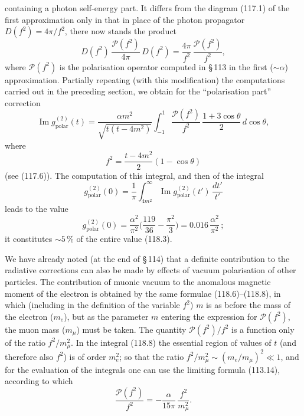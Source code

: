 
\begin{equation}
\label{eq:118.5}
\end{equation}


\noindent containing a photon self-energy part. It differs from the diagram (117.1) of the first approximation only in that in place of the photon propagator $D(f^2) = 4\pi/f^2$, there now stands the product
\[
D(f^2)\,\frac{\mathcal{P}(f^2)}{4\pi}\,D(f^2) = \frac{4\pi}{f^2}\,\frac{\mathcal{P}(f^2)}{f^2},
\]
where $\mathcal{P}(f^2)$ is the polarisation operator computed in \S\,113 in the first ($\sim\alpha$) approximation. Partially repeating (with this modification) the computations carried out in the preceding section, we obtain for the ``polarisation part'' correction
\begin{equation}
\operatorname{Im} g^{(2)}_{\text{polar}}(t) = \frac{\alpha m^2}{\sqrt{t(t-4m^2)}}\int_{-1}^{1}\frac{\mathcal{P}(f^2)}{f^2}\,\frac{1+3\cos\theta}{2}\,d\cos\theta,
\label{eq:118.6}
\end{equation}
where
\begin{equation}
f^2 = \frac{t-4m^2}{2}(1-\cos\theta)
\label{eq:118.7}
\end{equation}
(see (117.6)). The computation of this integral, and then of the integral
\begin{equation}
g^{(2)}_{\text{polar}}(0) = \frac{1}{\pi}\int_{4m^2}^{\infty}\operatorname{Im} g^{(2)}_{\text{polar}}(t')\,\frac{dt'}{t'}
\label{eq:118.8}
\end{equation}
leads to the value
\begin{equation}
g^{(2)}_{\text{polar}}(0) = \frac{\alpha^2}{\pi^2}\biggl(\frac{119}{36} - \frac{\pi^2}{3}\biggr) = 0.016\,\frac{\alpha^2}{\pi^2}\,;
\label{eq:118.9}
\end{equation}
it constitutes $\sim 5\,\%$ of the entire value (118.3).

We have already noted (at the end of \S\,114) that a definite contribution to the radiative corrections can also be made by effects of vacuum polarisation of other particles. The contribution of muonic vacuum to the anomalous magnetic moment of the electron is obtained by the same formulae (118.6)--(118.8), in which (including in the definition of the variable $f^2$) $m$ is as before the mass of the electron ($m_e$), but as the parameter $m$ entering the expression for $\mathcal{P}(f^2)$, the muon mass ($m_\mu$) must be taken. The quantity $\mathcal{P}(f^2)/f^2$ is a function only of the ratio $f^2/m_\mu^2$. In the integral (118.8) the essential region of values of $t$ (and therefore also $f^2$) is of order $m_e^2$; so that the ratio $f^2/m_\mu^2 \sim (m_e/m_\mu)^2 \ll 1$, and for the evaluation of the integrals one can use the limiting formula (113.14), according to which
\[
\frac{\mathcal{P}(f^2)}{f^2} = -\frac{\alpha}{15\pi}\,\frac{f^2}{m_\mu^2}.
\]

